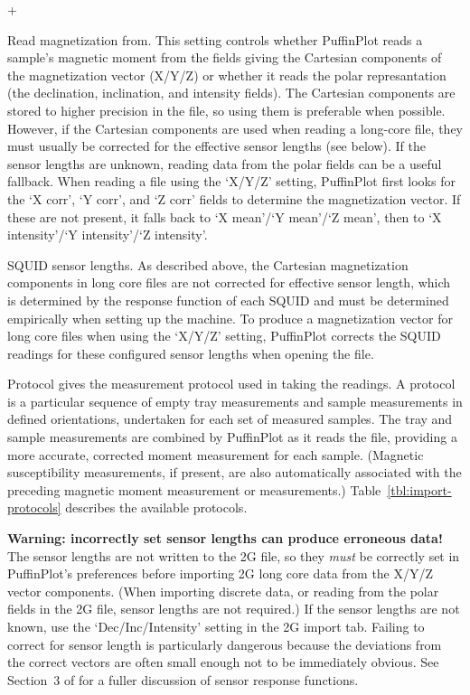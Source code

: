 \documentclass[a4paper,british]{article}
\newcommand{\menuitemlabel}[1]{%
\mbox{\textsf{#1}}\hfil}
\newenvironment{menuitemlist}%
{\begin{list}{}{%
\renewcommand{\makelabel}{\menuitemlabel}%
\setlength{\labelwidth}{35pt}%
\setlength{\leftmargin}%
             {\labelwidth+\labelsep}}}%
{\end{list}}
\newcommand{\caps}[1]{\MakeTextUppercase{#1}} %
\begin{document}
\begin{menuitemlist}

\item[Read magnetization from.] This setting controls whether PuffinPlot
  reads a sample's magnetic moment from the fields giving the Cartesian
  components of the magnetization vector (X/Y/Z) or whether it reads the
  polar represantation (the declination, inclination, and intensity fields).
  The Cartesian components are stored to higher precision in the file, so
  using them is preferable when possible. However, if the Cartesian
  components are used when reading a long-core file, they must usually be
  corrected for the effective sensor lengths (see below). If the sensor
  lengths are unknown, reading data from the polar fields can be a useful
  fallback. When reading a file using the `X/Y/Z' setting, PuffinPlot first
  looks for the `X corr', `Y corr', and `Z corr' fields to determine the
  magnetization vector. If these are not present, it falls back to `X
  mean'/`Y mean'/`Z mean', then to `X intensity'/`Y intensity'/`Z intensity'.

\item[\caps{Squid} sensor lengths.] As described above, the Cartesian
  magnetization components in long core files are not corrected for effective
  sensor length, which is determined by the response function of each
  \caps{squid} and must be determined empirically when setting up the
  machine. To produce a magnetization vector for long core files when using
  the ‘X/Y/Z’ setting, PuffinPlot corrects the \caps{squid} readings for
  these configured sensor lengths when opening the file.

\item[Protocol] gives the measurement protocol used in taking the readings. A
  protocol is a particular sequence of empty tray measurements and sample
  measurements in defined orientations, undertaken for each set of measured
  samples. The tray and sample measurements are combined by PuffinPlot as it
  reads the file, providing a more accurate, corrected moment measurement for
  each sample. (Magnetic susceptibility measurements, if present, are also
  automatically associated with the preceding magnetic moment measurement or
  measurements.) Table~\ref{tbl:import-protocols} describes the
  available protocols.

\end{menuitemlist}

\noindent\textbf{Warning: incorrectly set sensor lengths can produce erroneous data!}
The sensor lengths are not written to the 2G file, so they \textit{must}
be correctly set in PuffinPlot's preferences before importing 2G long
core data from the X/Y/Z vector components. (When importing discrete
data, or reading from the polar fields in the 2G file, sensor lengths
are not required.) If the sensor lengths are not known, use the
`Dec/Inc/Intensity' setting in the 2G import tab. Failing to correct for
sensor length is particularly dangerous because the deviations from the
correct vectors are often small enough not to be immediately obvious. See
Section~3 of \cite{roberts2006high} for a fuller discussion of sensor
response functions.
\end{document}
